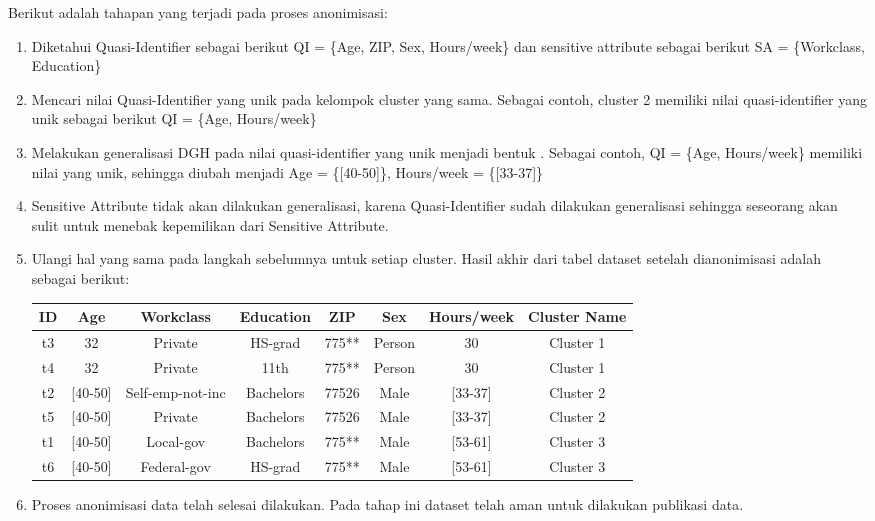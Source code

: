 \noindent Berikut adalah tahapan yang terjadi pada proses anonimisasi:
\begin{enumerate}

\item Diketahui Quasi-Identifier sebagai berikut QI = \{Age, ZIP, Sex, Hours/week\} dan sensitive attribute sebagai berikut SA = \{Workclass, Education\}

\item Mencari nilai Quasi-Identifier yang unik pada kelompok cluster yang sama. Sebagai contoh, cluster 2 memiliki nilai quasi-identifier yang unik sebagai berikut QI = \{Age, Hours/week\}

\item Melakukan generalisasi DGH pada nilai quasi-identifier yang unik menjadi bentuk . Sebagai contoh, QI = \{Age, Hours/week\} memiliki nilai yang unik, sehingga diubah menjadi Age = \{[40-50]\}, Hours/week = \{[33-37]\}

\item Sensitive Attribute tidak akan dilakukan generalisasi, karena Quasi-Identifier sudah dilakukan generalisasi sehingga seseorang akan sulit untuk menebak kepemilikan dari Sensitive Attribute.

\item Ulangi hal yang sama pada langkah sebelumnya untuk setiap cluster. Hasil akhir dari tabel dataset setelah dianonimisasi adalah sebagai berikut:  \\

\begin{tabular}{c c c c c c c c}
\hline 
ID & Age & Workclass & Education & ZIP & Sex & Hours/week & Cluster Name\\ 
\hline 
t3 & 32 & Private & HS-grad & 775** & Person & 30 & Cluster 1 \\ 
t4 & 32 & Private & 11th & 775** & Person & 30 & Cluster 1 \\ 
\hline 
t2 & [40-50] & Self-emp-not-inc & Bachelors & 77526 & Male & [33-37] & Cluster 2 \\ 
t5 & [40-50] & Private & Bachelors & 77526 & Male & [33-37]	& Cluster 2\\ 
\hline 
t1 & [40-50] & Local-gov & Bachelors & 775** & Male & [53-61] & Cluster 3\\ 
t6 & [40-50] & Federal-gov & HS-grad & 775** & Male & [53-61] & Cluster 3\\ 
\hline 
\end{tabular} 

\item Proses anonimisasi data telah selesai dilakukan. Pada tahap ini dataset telah aman untuk dilakukan publikasi data.

\end{enumerate}

